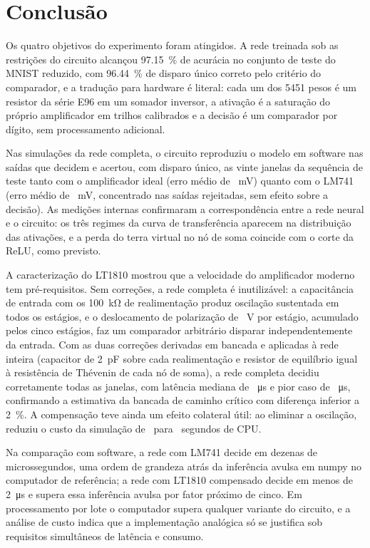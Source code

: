 \section{Conclusão}
\label{sec:conclusao}

Os quatro objetivos do experimento foram atingidos. A rede treinada
sob as restrições do circuito alcançou \SI{97,15}{\percent} de
acurácia no conjunto de teste do MNIST reduzido, com
\SI{96,44}{\percent} de disparo único correto pelo critério do
comparador, e a tradução para hardware é literal: cada um dos
\num{5451} pesos é um resistor da série E96 em um somador inversor, a
ativação é a saturação do próprio amplificador em trilhos calibrados e
a decisão é um comparador por dígito, sem processamento adicional.

Nas simulações da rede completa, o circuito reproduziu o modelo em
software nas saídas que decidem e acertou, com disparo único, as vinte
janelas da sequência de teste tanto com o amplificador ideal (erro
médio de \vErrIdealMedio~\si{\milli\volt}) quanto com o LM741 (erro
médio de \vErrLmMedio~\si{\milli\volt}, concentrado nas saídas
rejeitadas, sem efeito sobre a decisão). As medições internas
confirmaram a correspondência entre a rede neural e o circuito: os
três regimes da curva de transferência aparecem na distribuição das
ativações, e a perda do terra virtual no nó de soma coincide com o
corte da ReLU, como previsto.

A caracterização do LT1810 mostrou que a velocidade do amplificador
moderno tem pré-requisitos. Sem correções, a rede completa é
inutilizável: a capacitância de entrada com os \SI{100}{\kilo\ohm} de
realimentação produz oscilação sustentada em todos os estágios, e o
deslocamento de polarização de \vVtcOffsetMod~\si{\volt} por estágio,
acumulado pelos cinco estágios, faz um comparador arbitrário disparar
independentemente da entrada. Com as duas correções derivadas em
bancada e aplicadas à rede inteira (capacitor de
\SI{2}{\pico\farad} sobre cada realimentação e resistor de equilíbrio
igual à resistência de Thévenin de cada nó de soma), a rede completa
decidiu corretamente todas as janelas, com latência mediana de
\vModRedeLatMediana~\si{\micro\second} e pior caso de
\vModRedeLatMax~\si{\micro\second}, confirmando a estimativa da
bancada de caminho crítico com diferença inferior a
\SI{2}{\percent}. A compensação teve ainda um efeito colateral útil:
ao eliminar a oscilação, reduziu o custo da simulação de
\vModRedeCpuSemComp~para \vModRedeCpuComp~segundos de CPU.

Na comparação com software, a rede com LM741 decide em dezenas de
microssegundos, uma ordem de grandeza atrás da inferência avulsa em
numpy no computador de referência; a rede com LT1810 compensado decide
em menos de \SI{2}{\micro\second} e supera essa inferência avulsa por
fator próximo de cinco. Em processamento por lote o computador supera
qualquer variante do circuito, e a análise de custo indica que a
implementação analógica só se justifica sob requisitos simultâneos de
latência e consumo.


